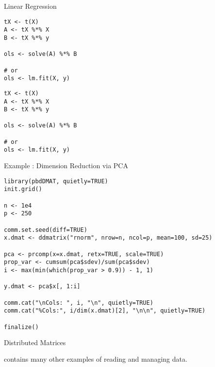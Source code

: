 \begin{frame}
  \begin{exampleblock}{Linear Regression}\pause
\begin{lstlisting}[title=Serial Code]
tX <- t(X)
A <- tX %*% X
B <- tX %*% y

ols <- solve(A) %*% B

# or
ols <- lm.fit(X, y)
\end{lstlisting}
  
\begin{lstlisting}[title=Parallel Code]
tX <- t(X)
A <- tX %*% X
B <- tX %*% y

ols <- solve(A) %*% B

# or
ols <- lm.fit(X, y)
\end{lstlisting}
  \end{exampleblock}
\end{frame}

\begin{frame}[fragile]
  \fontsize{8pt}{7.2}\selectfont
  \begin{exampleblock}{Example \countex:  Dimension Reduction via PCA}
    \begin{lstlisting}[title=6\_pca.r]
library(pbdDMAT, quietly=TRUE)
init.grid()

n <- 1e4
p <- 250

comm.set.seed(diff=TRUE)
x.dmat <- ddmatrix("rnorm", nrow=n, ncol=p, mean=100, sd=25)

pca <- prcomp(x=x.dmat, retx=TRUE, scale=TRUE)
prop_var <- cumsum(pca$sdev)/sum(pca$sdev)
i <- max(min(which(prop_var > 0.9)) - 1, 1)

y.dmat <- pca$x[, 1:i]

comm.cat("\nCols: ", i, "\n", quietly=TRUE)
comm.cat("%Cols:", i/dim(x.dmat)[2], "\n\n", quietly=TRUE)

finalize()
    \end{lstlisting} %
  \end{exampleblock}
\end{frame}

\begin{frame}
  \begin{block}{Distributed Matrices}\pause
  \begin{center}
     contains many other examples of reading and managing data.
  \end{center}
  \end{block}
\end{frame}


